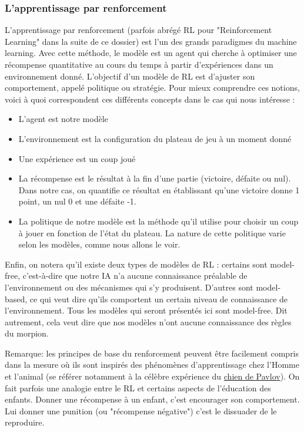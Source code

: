 \documentclass[french]{article}
\begin{document}
    \subsubsection{L'apprentissage par renforcement}
    L'apprentissage par renforcement (parfois abrégé RL pour "Reinforcement Learning" dans la suite de ce dossier) est l'un des grands paradigmes du machine learning. Avec cette méthode, le modèle est un agent qui cherche à optimiser une récompense quantitative au cours du temps à partir d'expériences dans un environnement donné. L'objectif d'un modèle de RL est d'ajuster son comportement, appelé politique ou stratégie. Pour mieux comprendre ces notions, voici à quoi correspondent ces différents concepts dans le cas qui nous intéresse :
    \begin{itemize}
        \item L'agent est notre modèle
        \item L'environnement est la configuration du plateau de jeu à un moment donné
        \item Une expérience est un coup joué 
        \item La récompense est le résultat à la fin d'une partie (victoire, défaite ou nul). Dans notre cas, on quantifie ce résultat en établissant qu'une victoire donne 1 point, un nul 0 et une défaite -1.
        \item La politique de notre modèle est la méthode qu'il utilise pour choisir un coup à jouer en fonction de l'état du plateau. La nature de cette politique varie selon les modèles, comme nous allons le voir.
    \end{itemize}

    Enfin, on notera qu'il existe deux types de modèles de RL : certains sont model-free, c'est-à-dire que notre IA n'a aucune connaissance préalable de l'environnement ou des mécanismes qui s'y produisent. D'autres sont model-based, ce qui veut dire qu'ils comportent un certain niveau de connaissance de l'environnement. Tous les modèles qui seront présentés ici sont model-free. Dit autrement, cela veut dire que nos modèles n'ont aucune connaissance des règles du morpion.
    
    Remarque: les principes de base du renforcement peuvent être facilement compris dans la mesure où ils sont inspirés des phénomènes d'apprentissage chez l'Homme et l'animal (se référer notamment à la célèbre expérience du \href{https://journals.openedition.org/bibnum/604}{chien de Pavlov}). On fait parfois une analogie entre le RL et certains aspects de l'éducation des enfants. Donner une récompense à un enfant, c'est encourager son comportement. Lui donner une punition (ou "récompense négative") c'est le dissuader de le reproduire.
\end{document}
